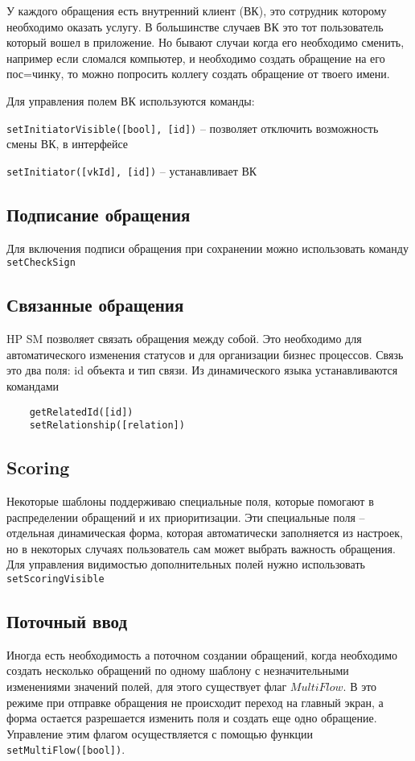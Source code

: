 \documentclass[../index.tex]{subfiles}
\begin{document}
У каждого обращения есть внутренний клиент (ВК), это сотрудник которому необходимо оказать услугу. В большинстве случаев 
ВК это тот пользователь который вошел в приложение. Но бывают случаи когда его необходимо сменить, например если сломался компьютер,
и необходимо создать обращение на его пос=чинку, то можно попросить коллегу создать обращение от твоего имени.

Для управления полем ВК используются команды:

\verb|setInitiatorVisible([bool], [id])| -- позволяет отключить возможность смены ВК, в интерфейсе


\verb|setInitiator([vkId], [id])| -- устанавливает ВК

\subsection{Подписание обращения}
Для включения подписи обращения при сохранении можно использовать команду \verb|setCheckSign|


\subsection{Связанные обращения}
HP SM позволяет связать обращения между собой. Это необходимо для автоматического изменения статусов и для
организации бизнес процессов. Связь это два поля: id объекта и тип связи. Из динамического языка устанавливаются командами
\begin{verbatim}
    getRelatedId([id])
    setRelationship([relation])
\end{verbatim} 

\subsection{Scoring}
Некоторые шаблоны поддерживаю специальные поля, которые помогают в распределении обращений и их приоритизации.
Эти специальные поля -- отдельная динамическая форма, которая автоматически заполняется из настроек, но в некоторых
случаях пользователь сам может выбрать важность обращения. Для управления видимостью дополнительных полей нужно использовать
\verb|setScoringVisible|

\subsection{Поточный ввод}
Иногда есть необходимость а поточном создании обращений, когда необходимо создать несколько обращений по одному 
шаблону с незначительными изменениями значений полей, для этого существует флаг $MultiFlow$. В это режиме
при отправке обращения не происходит переход на главный экран, а форма остается разрешается изменить поля и 
создать еще одно обращение. Управление этим флагом осуществляется с помощью функции \verb|setMultiFlow([bool])|.
\end{document}
